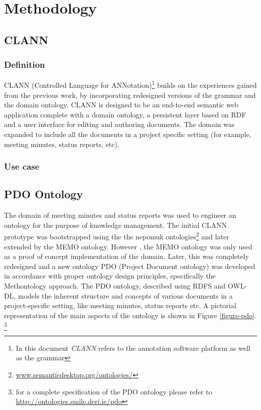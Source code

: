 \chapter{Methodology}


\section{CLANN}
\subsection{Definition}
CLANN (Controlled Language for ANNotation)\footnote{In this document \textit{CLANN} refers to the annotation software platform as well as the grammar} builds on the experiences gained from the previous work, by incorporating redesigned versions of the grammar and the domain ontology.  CLANN is designed to be an end-to-end semantic web application complete with a domain ontology, a persistent layer based on RDF and a user interface for editing and authoring documents.  The domain was expanded to include all the documents in a project specific setting (for example, meeting minutes, status reports, etc).

\subsection{Use case}


\section{PDO Ontology}
The domain of meeting minutes and status reports was used to engineer an ontology for the purpose of knowledge management.  The initial CLANN prototype was bootstrapped using the the nepomuk ontologies\footnote{\url{www.semanticdesktop.org/ontologies/}} and later extended by the MEMO ontology.  However , the MEMO ontology was only used as a proof of concept implementation of the domain.  Later,  this was completely redesigned and a new ontology PDO (Project Document ontology) was developed in accordance with proper ontology design principles, specifically the Methontology\cite{FLG+97} approach.  The PDO ontology, described using RDFS and OWL-DL, models the inherent structure and concepts of various documents in a project-specific setting, like meeting minutes, status reports etc.   A pictorial representation of the main aspects of the ontology is shown in Figure \ref{figure-pdo}.  \footnote{for a complete specification of the PDO ontology please refer to \url{http://ontologies.smile.deri.ie/pdo} }
% 

